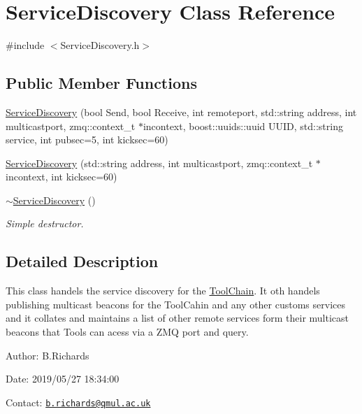 \hypertarget{classServiceDiscovery}{\section{Service\-Discovery Class Reference}
\label{classServiceDiscovery}
}


{\ttfamily \#include $<$Service\-Discovery.\-h$>$}

\subsection*{Public Member Functions}
\begin{DoxyCompactItemize}
\item 
\hyperlink{classServiceDiscovery_ab69c2cacaf5a388fac88e57f3361b576}{Service\-Discovery} (bool Send, bool Receive, int remoteport, std\-::string address, int multicastport, zmq\-::context\-\_\-t $\ast$incontext, boost\-::uuids\-::uuid U\-U\-I\-D, std\-::string service, int pubsec=5, int kicksec=60)
\item 
\hyperlink{classServiceDiscovery_a3dbd15f19345b0c9746731308e26b034}{Service\-Discovery} (std\-::string address, int multicastport, zmq\-::context\-\_\-t $\ast$incontext, int kicksec=60)
\item 
\hypertarget{classServiceDiscovery_aee64ecb3b4c07b7f2a070a66ecb7dc70}{\hyperlink{classServiceDiscovery_aee64ecb3b4c07b7f2a070a66ecb7dc70}{$\sim$\-Service\-Discovery} ()}\label{classServiceDiscovery_aee64ecb3b4c07b7f2a070a66ecb7dc70}

\begin{DoxyCompactList}\small\item\em Simple destructor. \end{DoxyCompactList}\end{DoxyCompactItemize}


\subsection{Detailed Description}
This class handels the service discovery for the \hyperlink{classToolChain}{Tool\-Chain}. It oth handels publishing multicast beacons for the Tool\-Cahin and any other customs services and it collates and maintains a list of other remote services form their multicast beacons that Tools can acess via a Z\-M\-Q port and query.

\begin{DoxyParagraph}{Author\-:}
B.\-Richards 
\end{DoxyParagraph}
\begin{DoxyParagraph}{Date\-:}
2019/05/27 18\-:34\-:00 
\end{DoxyParagraph}
Contact\-: \href{mailto:b.richards@qmul.ac.uk}{\tt b.\-richards@qmul.\-ac.\-uk} 


